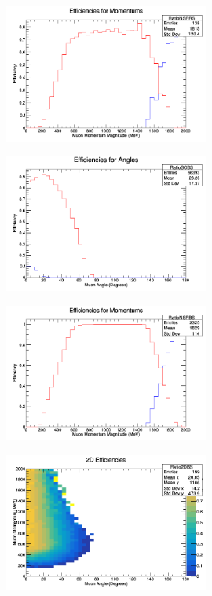 \documentclass[11pt]{article}
\begin{document}
\begin{figure}[H]
\centering
\includegraphics[width=0.6\textwidth]{ANMCombinedPlotsImages/2-ANMCombinedPlots.png}
\caption{}
\end{figure}

\begin{figure}[H]
\centering
\includegraphics[width=0.6\textwidth]{ANMCombinedPlotsImages/3-ANMCombinedPlots.png}
\caption{}
\end{figure}

\begin{figure}[H]
\centering
\includegraphics[width=0.6\textwidth]{ANMCombinedPlotsImages/4-ANMCombinedPlots.png}
\caption{}
\end{figure}

\begin{figure}[H]
\centering
\includegraphics[width=0.6\textwidth]{ANMCombinedPlotsImages/5-ANMCombinedPlots.png}
\caption{}
\end{figure}
\end{document}
